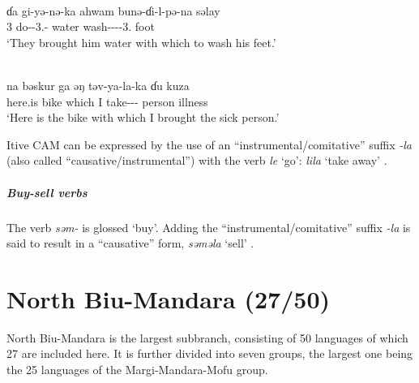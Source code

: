 \ea\label{ex2:vame6}
 \\
\gll ɗa gi-yə-nə-ka ahwam bunə-ɗi-l-pə-na səlay	\\
3 do--3.- water wash----3. foot \\
\glt `They brought him water with which to wash his feet.'

\ex\label{ex2:vame7}
 \\
\gll  na bəskur ga əŋ təv-ya-la-ka ɗu kuza	\\
here.is bike which I take--- person illness \\
\glt `Here is the bike with which I brought the sick person.'
\z 

Itive CAM can be expressed by the use of an ``instrumental{\slash}comitative'' suffix \textit{-la} (also called ``causative/instrumental'') with the verb \textit{le} `go': \textit{lila} `take away' \citep[43]{kinnairdVameVerbalSystem2006}.

\subparagraph{Buy-sell verbs}

The verb \textit{səm-} is glossed `buy'. Adding the ``instrumental{\slash}comitative'' suffix \textit{-la} is said to result in a ``causative'' form, \textit{səməla} `sell' \citep[47]{kinnairdVameVerbalSystem2006}.

\section{North Biu-Mandara (27/50)}

North Biu-Mandara is the largest subbranch, consisting of 50 languages of which 27 are included here. It is further divided into seven groups, the largest one being the 25 languages of the Margi-Mandara-Mofu group. 

